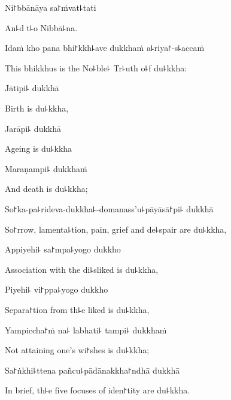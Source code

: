 Ni꜓bbānāya sa꜓ṁvat꜕tati

\begin{english}
  An꜕d t꜕o Nibbā꜕na.
\end{english}

Idaṁ kho pana bhi꜓kkh꜕ave dukkhaṁ a꜕riya꜓-s꜕accaṁ

\begin{english}
  This bhikkhus is the No꜕ble꜕ Tr꜕uth o꜕f du꜕kkha:
\end{english}

Jātipi꜕ dukkhā

\begin{english}
  Birth is du꜕kkha,
\end{english}

Jarāpi꜕ dukkhā

\begin{english}
  Ageing is du꜕kkha
\end{english}

Maraṇampi꜕ dukkhaṁ

\begin{english}
  And death is du꜕kkha;
\end{english}

So꜓ka-pa꜕rideva-dukkha꜕-domanass'u꜕pāyāsā꜓pi꜕ dukkhā

\begin{english}
  So꜓rrow, lamenta꜕tion, pain, grief and de꜕spair are du꜕kkha,
\end{english}

Appiyehi꜕ sa꜓mpa꜕yogo dukkho

\begin{english}
  Association with the di꜕sliked is du꜕kkha,
\end{english}

\ifaivedition
\clearpage
\fi

Piyehi꜕ vi꜓ppa꜕yogo dukkho

\begin{english}
  Separa꜓tion from th꜕e liked is du꜕kkha,
\end{english}

Yampiccha꜓ṁ na꜕ labhati꜕ tampi꜕ dukkhaṁ

\begin{english}
  Not attaining one's wi꜓shes is du꜕kkha;
\end{english}

Sa꜓ṅkhi꜕ttena pañcu꜕pādānakkha꜓ndhā dukkhā

\begin{english}
  In brief, th꜕e five focuses of iden꜓tity are du꜕kkha.
\end{english}

